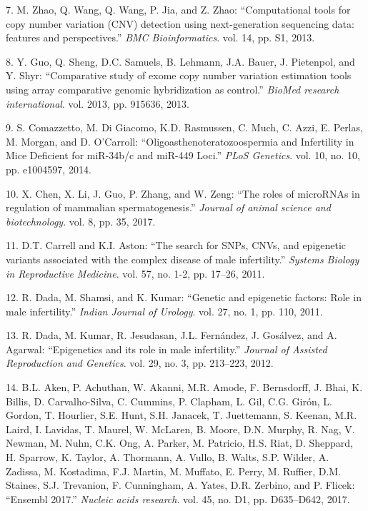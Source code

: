 \documentclass[12pt,twoside]{ugathesis}
\begin{document}
\hypertarget{ref-Zhao2013}{}
7. M. Zhao, Q. Wang, Q. Wang, P. Jia, and Z. Zhao: ``Computational tools
for copy number variation (CNV) detection using next-generation
sequencing data: features and perspectives.'' \emph{BMC Bioinformatics}.
vol. 14, pp. S1, 2013.

\hypertarget{ref-Guo2013}{}
8. Y. Guo, Q. Sheng, D.C. Samuels, B. Lehmann, J.A. Bauer, J. Pietenpol,
and Y. Shyr: ``Comparative study of exome copy number variation
estimation tools using array comparative genomic hybridization as
control.'' \emph{BioMed research international}. vol. 2013, pp. 915636,
2013.

\hypertarget{ref-Comazzetto2014}{}
9. S. Comazzetto, M. Di Giacomo, K.D. Rasmussen, C. Much, C. Azzi, E.
Perlas, M. Morgan, and D. O'Carroll: ``Oligoasthenoteratozoospermia and
Infertility in Mice Deficient for miR-34b/c and miR-449 Loci.''
\emph{PLoS Genetics}. vol. 10, no. 10, pp. e1004597, 2014.

\hypertarget{ref-Chen2017}{}
10. X. Chen, X. Li, J. Guo, P. Zhang, and W. Zeng: ``The roles of
microRNAs in regulation of mammalian spermatogenesis.'' \emph{Journal of
animal science and biotechnology}. vol. 8, pp. 35, 2017.

\hypertarget{ref-Carrell2011}{}
11. D.T. Carrell and K.I. Aston: ``The search for SNPs, CNVs, and
epigenetic variants associated with the complex disease of male
infertility.'' \emph{Systems Biology in Reproductive Medicine}. vol. 57,
no. 1-2, pp. 17--26, 2011.

\hypertarget{ref-Dada2011}{}
12. R. Dada, M. Shamsi, and K. Kumar: ``Genetic and epigenetic factors:
Role in male infertility.'' \emph{Indian Journal of Urology}. vol. 27,
no. 1, pp. 110, 2011.

\hypertarget{ref-Dada2012}{}
13. R. Dada, M. Kumar, R. Jesudasan, J.L. Fernández, J. Gosálvez, and A.
Agarwal: ``Epigenetics and its role in male infertility.'' \emph{Journal
of Assisted Reproduction and Genetics}. vol. 29, no. 3, pp. 213--223,
2012.

\hypertarget{ref-Aken2017}{}
14. B.L. Aken, P. Achuthan, W. Akanni, M.R. Amode, F. Bernsdorff, J.
Bhai, K. Billis, D. Carvalho-Silva, C. Cummins, P. Clapham, L. Gil, C.G.
Girón, L. Gordon, T. Hourlier, S.E. Hunt, S.H. Janacek, T. Juettemann,
S. Keenan, M.R. Laird, I. Lavidas, T. Maurel, W. McLaren, B. Moore, D.N.
Murphy, R. Nag, V. Newman, M. Nuhn, C.K. Ong, A. Parker, M. Patricio,
H.S. Riat, D. Sheppard, H. Sparrow, K. Taylor, A. Thormann, A. Vullo, B.
Walts, S.P. Wilder, A. Zadissa, M. Kostadima, F.J. Martin, M. Muffato,
E. Perry, M. Ruffier, D.M. Staines, S.J. Trevanion, F. Cunningham, A.
Yates, D.R. Zerbino, and P. Flicek: ``Ensembl 2017.'' \emph{Nucleic
acids research}. vol. 45, no. D1, pp. D635--D642, 2017.
\end{document}
